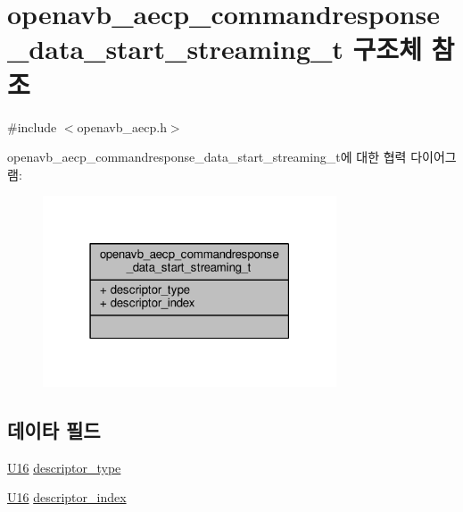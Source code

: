 \hypertarget{structopenavb__aecp__commandresponse__data__start__streaming__t}{}\section{openavb\+\_\+aecp\+\_\+commandresponse\+\_\+data\+\_\+start\+\_\+streaming\+\_\+t 구조체 참조}
\label{structopenavb__aecp__commandresponse__data__start__streaming__t}


{\ttfamily \#include $<$openavb\+\_\+aecp.\+h$>$}



openavb\+\_\+aecp\+\_\+commandresponse\+\_\+data\+\_\+start\+\_\+streaming\+\_\+t에 대한 협력 다이어그램\+:
\nopagebreak
\begin{figure}[H]
\begin{center}
\leavevmode
\includegraphics[width=247pt]{structopenavb__aecp__commandresponse__data__start__streaming__t__coll__graph}
\end{center}
\end{figure}
\subsection*{데이타 필드}
\begin{DoxyCompactItemize}
\item 
\hyperlink{openavb__types__base__pub_8h_a0a0a322d5fa4a546d293a77ba8b4a71f}{U16} \hyperlink{structopenavb__aecp__commandresponse__data__start__streaming__t_a1e231d7874aada5925b29affc76782cc}{descriptor\+\_\+type}
\item 
\hyperlink{openavb__types__base__pub_8h_a0a0a322d5fa4a546d293a77ba8b4a71f}{U16} \hyperlink{structopenavb__aecp__commandresponse__data__start__streaming__t_ab26fb363c24b9a2a4391f9171c981b08}{descriptor\+\_\+index}
\end{DoxyCompactItemize}


